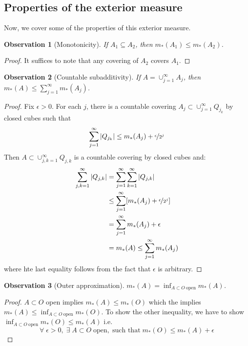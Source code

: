 \documentclass[a4paper, 11pt]{book}
\newtheorem{obs}{Observation}
\theoremstyle{definition}
\theoremstyle{remark}
\begin{document}
    \subsection{Properties of the exterior measure}

    Now, we cover some of the properties of this exterior measure.

    \begin{obs}[Monotonicity]
        If $A_1\subseteq A_2$, then $m_*(A_1)\leq m_*(A_2)$.
    \end{obs}
    \begin{proof}
        It suffices to note that any covering of $A_2$ covers $A_1$.
    \end{proof}

    \begin{obs}[Countable subadditivity]
        If $A=\cup_{j=1}^{\infty} A_j$, then $m_*(A) \leq \sum_{j=1}^{\infty} m_*(A_j)$.
    \end{obs}
    \begin{proof}
        Fix $\epsilon>0$. For each $j$, there is a countable covering $A_j\subset \cup_{j=1}^{\infty} Q_{j_k}$ by closed cubes
        such that
        \[ \sum_{j=1}^{\infty} |Q_{j_k}| \leq m_*(A_j) + \nicefrac{\epsilon}{2^j} \]
        Then $A\subset \cup_{j,k=1}^{\infty} Q_{j,k}$ is a countable covering by closed cubes and:
        \begin{align*}
            \sum_{j,k=1}^{\infty} |Q_{j,k}| &= \sum_{j=1}^{\infty} \sum_{k=1}^{\infty} |Q_{j,k}| \\
            &\leq \sum_{j=1}^{\infty} [m_*(A_j)+\nicefrac{\epsilon}{2^j}] \\
            &= \sum_{j=1}^{\infty} m_*(A_j) + \epsilon \\
            &= m_*(A) \leq \sum_{j=1}^{\infty} m_*(A_j) 
        \end{align*}
        where hte last equality follows from the fact that $\epsilon$ is arbitrary.
    \end{proof}

    \begin{obs}[Outer approximation]
        $m_*(A) = \inf_{A\subset O\:\text{open}} m_*(A)$.
    \end{obs}
    \begin{proof}
        $A\subset O$ open implies $m_*(A) \leq m_*(O)$ which the implies $m_*(A) \leq \inf_{A\subset O\:\text{open}} m_*(O)$.
        To show the other inequality, we have to show $\inf_{A\subset O\:\text{open}} m_*(O) \leq m_*(A)$ i.e.
        \[ \forall\;\epsilon>0,\;\exists\;A\subset O\;\text{open},\;\text{such that}\; m_*(O) \leq m_*(A) + \epsilon \]
    \end{proof}
\end{document}
